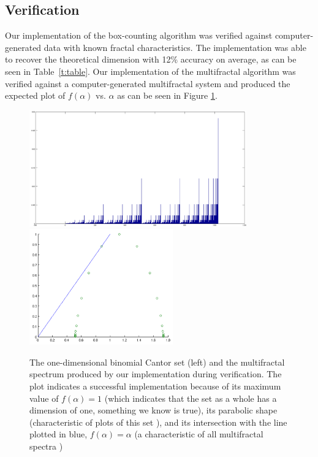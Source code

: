 \documentclass{emulateapj}
\begin{document}
\subsection{Verification}\label{Verification}

Our implementation of the box-counting algorithm was verified against computer-generated data with known fractal characteristics. The implementation was able to recover the theoretical dimension with 12\% accuracy on average, as can be seen in Table~\ref{t:table}. Our implementation of the multifractal algorithm was verified against a computer-generated multifractal system and produced the expected plot of $f(\alpha)$ vs. $\alpha$ as can be seen in Figure \ref{f:cantorset}. 

\begin{figure}[ht]
	\begin{center}
	\includegraphics[height=5cm,clip=true]{Graphics/binomialcantor1024.png}%
	\includegraphics[height=5cm,clip=true]{Graphics/firstf(a)plot!.png}%
	\end{center}
	\caption{The one-dimensional binomial Cantor set (left) and the multifractal spectrum produced by our implementation during verification. The plot indicates a successful implementation because of its maximum value of $f(\alpha) = 1$ (which indicates that the set as a whole has a dimension of one, something we know is true), its parabolic shape (characteristic of plots of this set \citep{Chhabra1989}), and its intersection with the line plotted in blue, $f(\alpha) = \alpha$ (a characteristic of all multifractal spectra \citep{mandelbrotmultifractal})}
	\label{f:cantorset}
	\end{figure}
\end{document}
